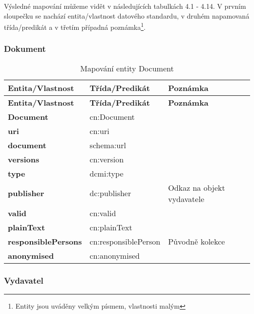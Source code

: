 Výsledné mapování můžeme vidět v následujících tabulkách 4.1 - 4.14. V prvním sloupečku se nachází entita/vlastnost datového standardu, v druhém napamovaná třída/predikát a v třetím případná poznámka\footnote{Entity jsou uváděny velkým písmem, vlastnosti malým}.

\subsubsection*{Dokument}

\begin{center}
\begin{longtable}{lp{30mm}p{65mm}}
\label{grid_mlmmh} \\
\multicolumn{1}{l}{\textbf{Entita/Vlastnost}} & 
\multicolumn{1}{l}{\textbf{Třída/Predikát}} & 
\multicolumn{1}{l}{\textbf{Poznámka}} \\ \hline 
\endfirsthead
\multicolumn{1}{l}{\textbf{Entita/Vlastnost}} & 
\multicolumn{1}{l}{\textbf{Třída/Predikát}} & 
\multicolumn{1}{l}{\textbf{Poznámka}} \\ \hline 
\hline
\endhead
\endfoot
\caption{Mapování entity Document}
\endlastfoot
\textbf{Document} & cn:Document \\
\textbf{uri} & cn:uri \\
\textbf{document} & schema:url \\
\textbf{versions} & cn:version \\
\textbf{type} & dcmi:type \\
\textbf{publisher} & dc:publisher & Odkaz na objekt vydavatele \\
\textbf{valid} & cn:valid \\
\textbf{plainText} & cn:plainText \\
\textbf{responsiblePersons} & cn:responsiblePerson & Původně kolekce \\
\textbf{anonymised} & cn:anonymised \\
\end{longtable}
\end{center}

\subsubsection*{Vydavatel}

